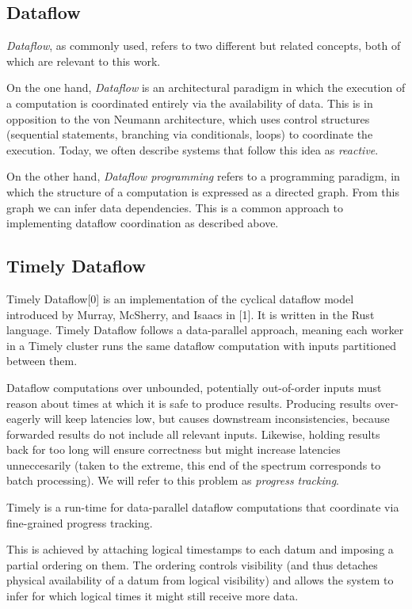 \documentclass[../index.tex]{subfiles}
\begin{document}
\subsection{Dataflow}

\emph{Dataflow}, as commonly used, refers to two different but related
concepts, both of which are relevant to this work.

On the one hand, \emph{Dataflow} is an architectural paradigm in which
the execution of a computation is coordinated entirely via the
availability of data. This is in opposition to the von Neumann
architecture, which uses control structures (sequential statements,
branching via conditionals, loops) to coordinate the execution. Today,
we often describe systems that follow this idea as \emph{reactive}.

On the other hand, \emph{Dataflow programming} refers to a programming
paradigm, in which the structure of a computation is expressed as a
directed graph. From this graph we can infer data dependencies. This
is a common approach to implementing dataflow coordination as
described above.

\subsection{Timely Dataflow}

Timely Dataflow[0] is an implementation of the cyclical dataflow model
introduced by Murray, McSherry, and Isaacs in [1]. It is written in
the Rust language. Timely Dataflow follows a data-parallel approach,
meaning each worker in a Timely cluster runs the same dataflow
computation with inputs partitioned between them.

Dataflow computations over unbounded, potentially out-of-order inputs
must reason about times at which it is safe to produce
results. Producing results over-eagerly will keep latencies low, but
causes downstream inconsistencies, because forwarded results do not
include all relevant inputs. Likewise, holding results back for too
long will ensure correctness but might increase latencies
unneccesarily (taken to the extreme, this end of the spectrum
corresponds to batch processing). We will refer to this problem as
\emph{progress tracking}.

Timely is a run-time for data-parallel dataflow computations that
coordinate via fine-grained progress tracking. 

This is achieved by attaching logical timestamps to each datum and
imposing a partial ordering on them. The ordering controls visibility
(and thus detaches physical availability of a datum from logical
visibility) and allows the system to infer for which logical times it
might still receive more data.
\end{document}
